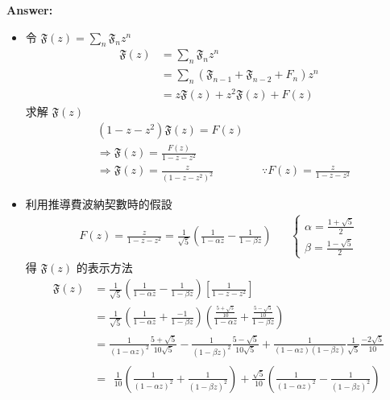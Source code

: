\documentclass[11pt,fleqn]{article}
\renewcommand\part[1]{\vspace{.10in}\textbf{#1}}
\begin{document}
\part{Answer:}

\begin{itemize}
	\item 令 $\mathfrak{F}(z) = \sum_n \mathfrak{F}_n z^n$
		\begin{align*}
		\mathfrak{F}(z) &= \sum_n \mathfrak{F}_n z^n \\
			&= \sum_n (\mathfrak{F}_{n-1}+\mathfrak{F}_{n-2}+F_n) z^n \\
			&= z \mathfrak{F}(z) + z^2 \mathfrak{F}(z) + F(z)
		\end{align*}
		求解 $\mathfrak{F}(z)$
		\begin{align*}
		&(1 - z - z^2) \mathfrak{F}(z) = F(z) \\
		&\Rightarrow \mathfrak{F}(z) = \frac{F(z)}{1 - z - z^2} \\
		&\Rightarrow \mathfrak{F}(z) = \frac{z}{(1 - z - z^2)^2} 
			&& \because F(z) = \frac{z}{1-z-z^2}
		\end{align*}
	\item 利用推導費波納契數時的假設 
		\begin{align*}
			F(z)=\frac{z}{1-z-z^2} = \frac{1}{\sqrt{5}} \left(\frac{1}{1- \alpha z} - \frac{1}{1- \beta z}\right) && \left\{\begin{matrix}\alpha = \frac{1+\sqrt{5}}{2}\\ \beta = \frac{1-\sqrt{5}}{2}\end{matrix}\right.
		\end{align*}
		得 $\mathfrak{F}(z)$ 的表示方法
		\begin{align*}
			\mathfrak{F}(z) &= \frac{1}{\sqrt{5}} \left(\frac{1}{1- \alpha z} - \frac{1}{1- \beta z}\right) \left[ \frac{1}{1-z-z^2} \right] \\
				&= \frac{1}{\sqrt{5}} \left(\frac{1}{1- \alpha z} + \frac{-1}{1- \beta z}\right) 
					\left( \frac{\frac{5+\sqrt{5}}{10}}{1-\alpha z} + 
						\frac{\frac{5-\sqrt{5}}{10}}{1-\beta z} \right) \\
				&= \frac{1}{(1-\alpha z)^2} \frac{5 + \sqrt{5}}{10\sqrt{5}} 
					- \frac{1}{(1-\beta z)^2} \frac{5 - \sqrt{5}}{10\sqrt{5}} 
					+ \frac{1}{(1-\alpha z)(1-\beta z)} \frac{1}{\sqrt{5}} \frac{-2\sqrt{5}}{10}
					\\
				&= \begin{aligned}
					\frac{1}{10} \left( \frac{1}{(1-\alpha z)^2} + \frac{1}{(1-\beta z)^2}\right)
					+ \frac{\sqrt{5}}{10} \left( \frac{1}{(1-\alpha z)^2} - \frac{1}{(1-\beta z)^2}\right)

\end{aligned}
\end{align*}
\end{itemize}
\end{document}
